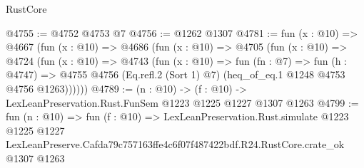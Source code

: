 \begin{lexlean}{RustCore}
\begin{coremodule}
@4755 := @4752 @4753 @7
@4756 := @1262 @1307
@4781 := fun (x : @10) =>
  @4667
    (fun (x : @10) =>
    @4686
      (fun (x : @10) =>
      @4705
        (fun (x : @10) =>
        @4724
          (fun (x : @10) =>
          @4743
            (fun (x : @10) =>
            fun (fn : @7) =>
            fun (h : @4747) =>
            @4755 @4756 (Eq.refl.{2} (Sort 1) @7) (heq_of_eq.{1} @1248 @4753 @4756 @1263))))))
@4789 := (n : @10) -> (f : @10) -> LexLeanPreservation.Rust.FunSem @1223 @1225 @1227 @1307 @1263
@4799 := fun (n : @10) =>
  fun (f : @10) =>
  LexLeanPreservation.Rust.simulate
    @1223
    @1225
    @1227
    LexLeanPreserve.Cafda79c757163ffe4c6f07f487422bdf.R24.RustCore.crate_ok
    @1307
    @1263
\end{coremodule}
\end{lexlean}
